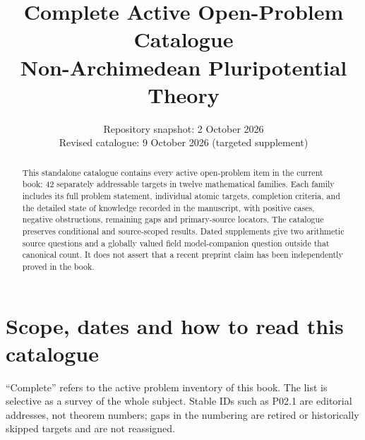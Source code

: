 \documentclass[11pt,a4paper]{article}
\title{Complete Active Open-Problem Catalogue\\[.5em]\large Non-Archimedean Pluripotential Theory}
\author{}
\date{Repository snapshot: 2 October 2026\\Revised catalogue: 9 October 2026 (targeted supplement)}
\theoremstyle{definition}
\theoremstyle{remark}
\begin{document}
\maketitle
\begin{abstract}
This standalone catalogue contains every active open-problem item in the
current book: 42 separately addressable targets in twelve mathematical
families. Each family includes its full problem statement, individual
atomic targets, completion criteria, and the detailed state of knowledge
recorded in the manuscript, with positive cases, negative obstructions,
remaining gaps and primary-source locators. The catalogue preserves
conditional and source-scoped results. Dated supplements give two
arithmetic source questions and a globally valued field model-companion
question outside that canonical count. It does not assert that a recent
preprint claim has been independently proved in the book.
\end{abstract}
\tableofcontents
\clearpage
\section*{Scope, dates and how to read this catalogue}
``Complete'' refers to the active problem inventory of this book. The list
is selective as a survey of the whole subject. Stable IDs such as P02.1
are editorial addresses, not theorem numbers; gaps in the numbering are
retired or historically skipped targets and are not reassigned.
\end{document}
